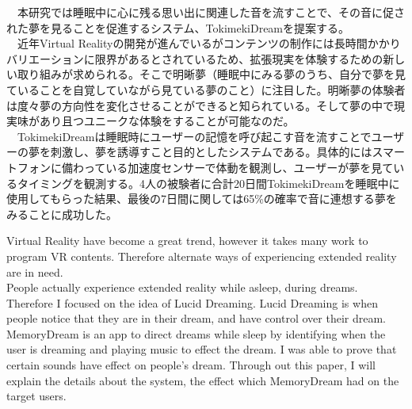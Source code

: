 
\begin{jabstract}
　本研究では睡眠中に心に残る思い出に関連した音を流すことで、その音に促された夢を見ることを促進するシステム、TokimekiDreamを提案する。\\
　近年Virtual Realityの開発が進んでいるがコンテンツの制作には長時間かかりバリエーションに限界があるとされているため、拡張現実を体験するための新しい取り組みが求められる。そこで明晰夢（睡眠中にみる夢のうち、自分で夢を見ていることを自覚していながら見ている夢のこと）に注目した。明晰夢の体験者は度々夢の方向性を変化させることができると知られている。そして夢の中で現実味があり且つユニークな体験をすることが可能なのだ。\\
　TokimekiDreamは睡眠時にユーザーの記憶を呼び起こす音を流すことでユーザーの夢を刺激し、夢を誘導すこと目的としたシステムである。具体的にはスマートフォンに備わっている加速度センサーで体動を観測し、ユーザーが夢を見ているタイミングを観測する。4人の被験者に合計20日間TokimekiDreamを睡眠中に使用してもらった結果、最後の7日間に関しては65\%の確率で音に連想する夢をみることに成功した。
\end{jabstract}

\begin{eabstract}
  Virtual Reality have become a great trend, however it takes many work to program VR contents. Therefore alternate ways of experiencing extended reality are in need. \\
  People actually experience extended reality while asleep, during dreams. Therefore I focused on the idea of Lucid Dreaming. Lucid Dreaming is when people notice that they are in their dream, and have control over their dream.\\
  MemoryDream is an app to direct dreams while sleep by identifying when the user is dreaming and playing music to effect the dream. I was able to prove that certain sounds have effect on people's dream. Through out this paper, I will explain the details about the system, the effect which MemoryDream had on the target users.
\end{eabstract}